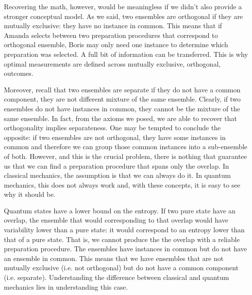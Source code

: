 
Recovering the math, however, would be meaningless if we didn't also provide a stronger conceptual model. As we said, two ensembles are orthogonal if they are mutually exclusive: they have no instance in common. This means that if Amanda selects between two preparation procedures that correspond to orthogonal ensemble, Boris may only need one instance to determine which preparation was selected. A full bit of information can be transferred. This is why optimal measurements are defined across mutually exclusive, orthogonal, outcomes.

Moreover, recall that two ensembles are separate if they do not have a common component, they are not different mixture of the same ensemble. Clearly, if two ensembles do not have instances in common, they cannot be the mixture of the same ensemble. In fact, from the axioms we posed, we are able to recover that orthogonality implies separateness. One may be tempted to conclude the opposite: if two ensembles are not orthogonal, they have some instances in common and therefore we can group those common instances into a sub-ensemble of both. However, and this is the crucial problem, there is nothing that guarantee us that we can find a preparation procedure that spans only the overlap. In classical mechanics, the assumption is that we can always do it. In quantum mechanics, this does not always work and, with these concepts, it is easy to see why it should be.

Quantum states have a lower bound on the entropy. If two pure state have an overlap, the ensemble that would corresponding to that overlap would have variability lower than a pure state: it would correspond to an entropy lower than that of a pure state. That is, we cannot produce the the overlap with a reliable preparation procedure. The ensembles have instances in common but do not have an ensemble in common. This means that we have ensembles that are not mutually exclusive (i.e. not orthogonal) but do not have a common component (i.e. separate). Understanding the difference between classical and quantum mechanics lies in understanding this case.

